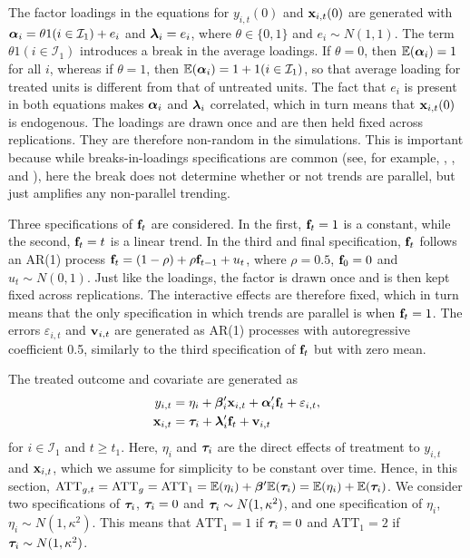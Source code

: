 \documentclass[12pt,fleqn]{article}
\begin{document}
  The factor loadings in the equations for $y_{i,t}(0)$ and $\mathbf{x}_{i,t}(0)$ are generated with $\boldsymbol{\alpha}_i =  \theta 1(i \in \mathcal{I}_1) + e_i$ and $\boldsymbol{\lambda}_i = e_i$, where $\theta\in \{0,1\}$ and $e_i \sim N(1,1)$. The term $\theta 1(i \in \mathcal{I}_1)$ introduces a break in the average loadings. If $\theta = 0$, then $\mathbb{E}(\boldsymbol{\alpha}_i) = 1$ for all $i$, whereas if $\theta = 1$, then $\mathbb{E}(\boldsymbol{\alpha}_i) = 1+1(i \in \mathcal{I}_1)$, so that average loading for treated units is different from that of untreated units. The fact that $e_i$ is present in both equations makes $\boldsymbol{\alpha}_i$ and $\boldsymbol{\lambda}_i$ correlated, which in turn means that $\mathbf{x}_{i,t}(0)$ is endogenous. The loadings are drawn once and are then held fixed across replications. They are therefore non-random in the simulations. This is important because while breaks-in-loadings specifications are common (see, for example, \citealp{chan2022pcdid}, \citealp{Gobillon_Magnac_2016}, and \citealp{Xu_2017}), here the break does not determine whether or not trends are parallel, but just amplifies any non-parallel trending.
  
  Three specifications of $\mathbf{f}_t$ are considered. In the first, $\mathbf{f}_{t} = 1$ is a constant, while the second, $\mathbf{f}_{t} = t$ is a linear trend. In the third and final specification, $\mathbf{f}_t$ follows an AR(1) process $\mathbf{f}_{t} = (1-\rho) + \rho \mathbf{f}_{t-1} + u_{t}$, where $\rho = 0.5$, $\mathbf{f}_{0} = 0$ and $u_{t} \sim N(0,1)$. Just like the loadings, the factor is drawn once and is then kept fixed across replications. The interactive effects are therefore fixed, which in turn means that the only specification in which trends are parallel is when $\mathbf{f}_{t} = 1$. The errors $\varepsilon_{i,t}$ and $\mathbf{v}_{i,t}$ are generated as AR(1) processes with autoregressive coefficient 0.5, similarly to the third specification of $\mathbf{f}_{t}$ but with zero mean.
  
  The treated outcome and covariate are generated as
  \begin{align}
  y_{i,t} & = \eta_{i} + \boldsymbol{\beta}_i'\mathbf{x}_{i,t} + \boldsymbol{\alpha}_i'\mathbf{f}_t + \varepsilon_{i,t}, \\
  \mathbf{x}_{i,t} & = \boldsymbol{\tau}_{i} + \boldsymbol{\lambda}_i'\mathbf{f}_t + \mathbf{v}_{i,t}
  \end{align}
  for $i \in \mathcal{I}_1$ and $t \geq t_1$. Here, $\eta_i$ and $\boldsymbol{\tau}_i$ are the direct effects of treatment to $y_{i,t}$ and $\mathbf{x}_{i,t}$, which we assume for simplicity to be constant over time. Hence, in this section, $\mathrm{ATT}_{g,t} = \mathrm{ATT}_{g}= \mathrm{ATT}_{1} = \mathbb{E}(\eta_{i}) + \boldsymbol{\beta}'\mathbb{E}(\boldsymbol{\tau}_{i})= \mathbb{E}(\eta_{i}) + \mathbb{E}(\boldsymbol{\tau}_{i})$. We consider two specifications of $\boldsymbol{\tau}_{i}$, $\boldsymbol{\tau}_{i} = 0$ and $\boldsymbol{\tau}_{i} \sim N(1,\kappa^2)$, and one specification of $\eta_i$, $\eta_i \sim N(1,\kappa^2)$. This means that $\mathrm{ATT}_{1} = 1$ if $\boldsymbol{\tau}_{i} = 0$ and $\mathrm{ATT}_{1} = 2$ if $\boldsymbol{\tau}_{i} \sim N(1,\kappa^2)$.
  
\end{document}
